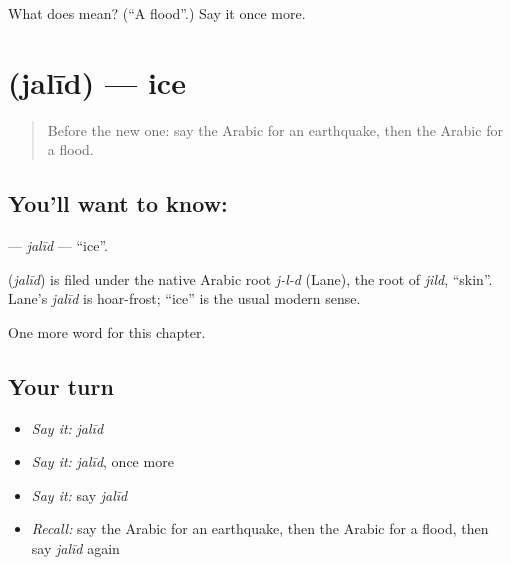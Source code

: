 \begin{tcolorbox}[breakable,colback=teal!4,colframe=teal!35!black,title={Before you move on}]
What does  mean? (\textquotedblleft{}A flood\textquotedblright{}.) Say it once more.
\end{tcolorbox}
\section[\texorpdfstring{\ar{جليد} (jalīd)}{جليد (jalīd)}]{ (jalīd) — ice}

\label{lesson:AR-C236-jalid}



\begin{quote}
Before the new one: say the Arabic for an earthquake, then the Arabic for a flood.
\end{quote}

\subsection*{You'll want to know: }
\textbf{} — \emph{jalīd} — \textquotedblleft{}ice\textquotedblright{}.

\begin{cousinweb}
\textbf{} (\emph{jalīd}) is filed under the native Arabic root \emph{j-l-d} (Lane), the root of \emph{jild}, \textquotedblleft{}skin\textquotedblright{}. Lane's \emph{jalīd} is hoar-frost; \textquotedblleft{}ice\textquotedblright{} is the usual modern sense.
\end{cousinweb}

\begin{grammarlens}[title={What you've built}]
One more word for this chapter.
\end{grammarlens}

\subsection*{Your turn}
\begin{itemize}
\raggedright
  \item \emph{Say it:} \emph{jalīd}
  \item \emph{Say it:} \emph{jalīd}, once more
  \item \emph{Say it:} say \emph{jalīd}
  \item \emph{Recall:} say the Arabic for an earthquake, then the Arabic for a flood, then say \emph{jalīd} again
\end{itemize}


